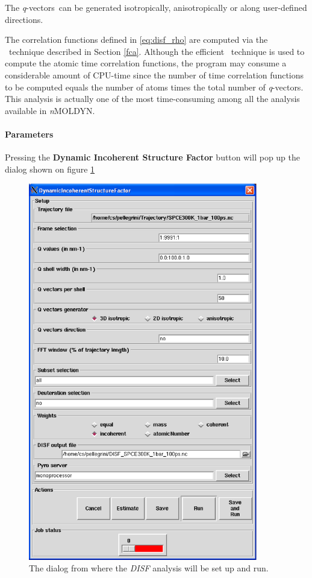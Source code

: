 \documentclass[a4paper,11pt]{report}
\newcommand{\qvects}{\textit{q}-vectors}
\newcommand{\NMOLDYN}{\textit{n}MOLDYN}
\begin{document}
The \qvects\ can be generated isotropically, anisotropically or along user-defined directions.

The correlation functions defined in \ref{eq:disf_rho} are computed via the \FCA\ technique described in Section \ref{fca}.
Although the efficient \FCA\ technique is used to compute the atomic time correlation functions, the program may consume a 
considerable amount of CPU-time since the number of time correlation functions to be computed equals the number of 
atoms times the total number of \qvects. This analysis is actually one of the most time-consuming among all the analysis available in 
\NMOLDYN.

\paragraph{Parameters\\}
\label{disf_parameters}
Pressing the \textbf{Dynamic Incoherent Structure Factor} button will pop up the dialog shown on figure \ref{fig:disf}
\begin{figure}[h!]
\begin{center}
\includegraphics[width=10cm]{Figures/disf.eps}
\end{center}
\caption[The \textit{DISF} analysis dialog]{The dialog from where the \textit{DISF} analysis will be set up and run.}
\label{fig:disf}
\end{figure}   
\end{document}
